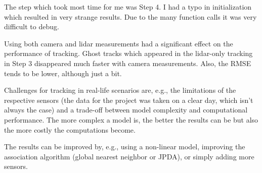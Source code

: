 \documentclass[11pt, a4paper]{amsart}
\begin{document}
	The step which took most time for me was Step 4. I had a typo in initialization which resulted in very strange results. Due to the many function calls it was very difficult to debug.
	
	Using both camera and lidar measurements had a significant effect on the performance of tracking. Ghost tracks which appeared in the lidar-only tracking in Step 3 disappeared much faster with camera measurements. Also, the RMSE tends to be lower, although just a bit.
	
	Challenges for tracking in real-life scenarios are, e.g., the limitations of the respective sensors (the data for the project was taken on a clear day, which isn't always the case) and a trade-off between model complexity and computational performance. The more complex a model is, the better the results can be but also the more costly the computations become.
	
	The results can be improved by, e.g., using a non-linear model, improving the association algorithm (global nearest neighbor or JPDA), or simply adding more sensors.
\end{document}
